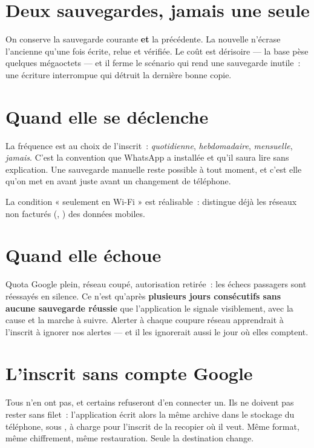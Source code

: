 \documentclass[11pt,a4paper,oneside]{report}
\begin{document}
\section{Deux sauvegardes, jamais une seule}

On conserve la sauvegarde courante \textbf{et} la précédente. La nouvelle n'écrase l'ancienne
qu'une fois écrite, relue et vérifiée. Le coût est dérisoire --- la base pèse quelques
mégaoctets --- et il ferme le scénario qui rend une sauvegarde inutile~: une écriture
interrompue qui détruit la dernière bonne copie.

\section{Quand elle se déclenche}

La fréquence est au choix de l'inscrit~: \emph{quotidienne}, \emph{hebdomadaire},
\emph{mensuelle}, \emph{jamais}. C'est la convention que WhatsApp a installée et qu'il
saura lire sans explication. Une sauvegarde manuelle reste possible à tout moment, et c'est
elle qu'on met en avant juste avant un changement de téléphone.

\begin{constat}
La condition « seulement en Wi-Fi » est réalisable~:  distingue
déjà les réseaux non facturés (, ) des données mobiles.
\end{constat}

\section{Quand elle échoue}

Quota Google plein, réseau coupé, autorisation retirée~: les échecs passagers sont réessayés
en silence. Ce n'est qu'après \textbf{plusieurs jours consécutifs sans aucune sauvegarde
réussie} que l'application le signale visiblement, avec la cause et la marche à suivre.
Alerter à chaque coupure réseau apprendrait à l'inscrit à ignorer nos alertes --- et il les
ignorerait aussi le jour où elles comptent.

\section{L'inscrit sans compte Google}

Tous n'en ont pas, et certains refuseront d'en connecter un. Ils ne doivent pas rester sans
filet~: l'application écrit alors la même archive dans le stockage du téléphone, sous
, à charge pour l'inscrit de la recopier où il veut. Même
format, même chiffrement, même restauration. Seule la destination change.
\end{document}
